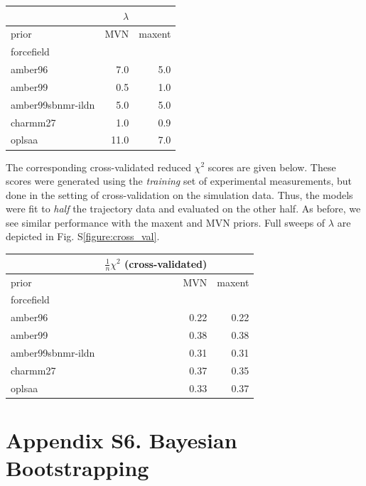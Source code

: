 \documentclass[journal=jacsat,manuscript=article]{achemso}
\begin{document}
\vspace{5mm}

\begin{tabular}{lrr}
\toprule
{}                &$\lambda$  &         \\
\midrule
prior &       MVN &  maxent \\
forcefield        &           &         \\
amber96           &      7.0  &    5.0  \\
amber99           &      0.5  &    1.0 \\
amber99sbnmr-ildn &      5.0  &    5.0 \\
charmm27          &      1.0  &    0.9 \\
oplsaa            &     11.0 &    7.0 \\
\bottomrule
\end{tabular}

\vspace{5mm}

The corresponding cross-validated reduced $\chi^2$ scores are given below.  These scores were generated using the \emph{training} set of experimental measurements, but done in the setting of cross-validation on the simulation data.  Thus, the models were fit to \emph{half} the trajectory data and evaluated on the other half.  As before, we see similar performance with the maxent and MVN priors.  Full sweeps of $\lambda$ are depicted in Fig. S\ref{figure:cross_val}.  

\vspace{5mm}


\begin{tabular}{lrr}
\toprule
{} &  $\frac{1}{n}\chi^2$ (cross-validated) &         \\
\midrule
prior &       MVN &  maxent \\
forcefield        &           &         \\
amber96           &      0.22 &    0.22 \\
amber99           &      0.38 &    0.38 \\
amber99sbnmr-ildn &      0.31 &    0.31 \\
charmm27          &      0.37 &    0.35 \\
oplsaa            &      0.33 &    0.37 \\
\bottomrule
\end{tabular}

\newpage

\section{Appendix S6.  Bayesian Bootstrapping}
\end{document}
